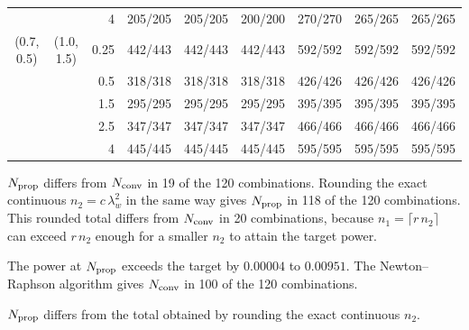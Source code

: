 \begin{table}[ht]
\begin{threeparttable}
\begin{tabular}{ccrrrrrrr}
 &  & 4 & 205/205 & 205/205 & 200/200 & 270/270 & 265/265 & 265/265 \\
(0.7, 0.5) & (1.0, 1.5) & 0.25 & 442/443 & 442/443 & 442/443 & 592/592 & 592/592 & 592/592 \\
 &  & 0.5 & 318/318 & 318/318 & 318/318 & 426/426 & 426/426 & 426/426 \\
 &  & 1.5 & 295/295 & 295/295 & 295/295 & 395/395 & 395/395 & 395/395 \\
 &  & 2.5 & 347/347 & 347/347 & 347/347 & 466/466 & 466/466 & 466/466 \\
 &  & 4 & 445/445 & 445/445 & 445/445 & 595/595 & 595/595 & 595/595 \\
\hline
\end{tabular}
\begin{tablenotes}
\footnotesize
\item[] $N_{\rm prop}$ differs from $N_{\rm conv}$ in 19 of the 120 combinations. Rounding the exact continuous $n_2 = c\,\lambda_w^2$ in the same way gives $N_{\rm prop}$ in 118 of the 120 combinations. This rounded total differs from $N_{\rm conv}$ in 20 combinations, because $n_1 = \lceil r\,n_2 \rceil$ can exceed $r\,n_2$ enough for a smaller $n_2$ to attain the target power.
\item[] The power at $N_{\rm prop}$ exceeds the target by $0.00004$ to $0.00951$. The Newton--Raphson algorithm gives $N_{\rm conv}$ in 100 of the 120 combinations.
\item[$\dagger$] $N_{\rm prop}$ differs from the total obtained by rounding the exact continuous $n_2$.
\end{tablenotes}
\end{threeparttable}
\end{table}
